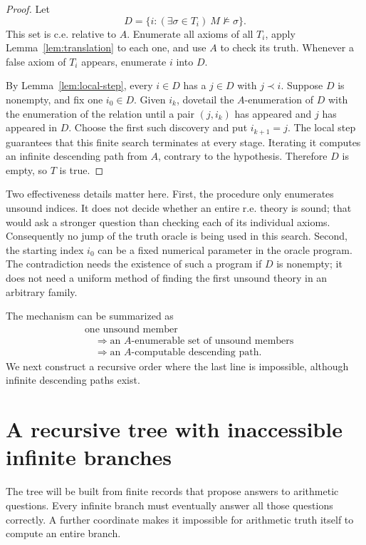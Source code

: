 \documentclass[11pt]{article}
\theoremstyle{definition}
\begin{document}
\begin{proof}
Let
\begin{equation}\label{eq:bad-set}
 D=\{i:(\exists\sigma\in T_i)\ M\not\models\sigma\}.
\end{equation}
This set is c.e. relative to $A$. Enumerate all axioms of all $T_i$, apply
Lemma~\ref{lem:translation} to each one, and use $A$ to check its truth.
Whenever a false axiom of $T_i$ appears, enumerate $i$ into $D$.

By Lemma~\ref{lem:local-step}, every $i\in D$ has a $j\in D$ with
$j\prec i$. Suppose $D$ is nonempty, and fix one $i_0\in D$. Given
$i_k$, dovetail the $A$-enumeration of $D$ with the enumeration of the
relation until a pair $(j,i_k)$ has appeared and $j$ has appeared in $D$.
Choose the first such discovery and put $i_{k+1}=j$. The local step
guarantees that this finite search terminates at every stage. Iterating it
computes an infinite descending path from $A$, contrary to the hypothesis.
Therefore $D$ is empty, so $T$ is true.
\end{proof}

Two effectiveness details matter here. First, the procedure only enumerates
unsound indices. It does not decide whether an entire r.e. theory is sound;
that would ask a stronger question than checking each of its individual
axioms. Consequently no jump of the truth oracle is being used in this
search. Second, the starting index $i_0$ can be a fixed numerical parameter
in the oracle program. The contradiction needs the existence of such a
program if $D$ is nonempty; it does not need a uniform method of finding
the first unsound theory in an arbitrary family.

The mechanism can be summarized as
\[
 \begin{aligned}
 &\text{one unsound member}\\
 &\quad\Longrightarrow\text{an $A$-enumerable set of unsound members}\\
 &\quad\Longrightarrow\text{an $A$-computable descending path}.
 \end{aligned}
\]
We next construct a recursive order where the last line is impossible,
although infinite descending paths exist.

\section{A recursive tree with inaccessible infinite branches}\label{sec:tree}

The tree will be built from finite records that propose answers to arithmetic
questions. Every infinite branch must eventually answer all those questions
correctly. A further coordinate makes it impossible for arithmetic truth
itself to compute an entire branch.
\end{document}
